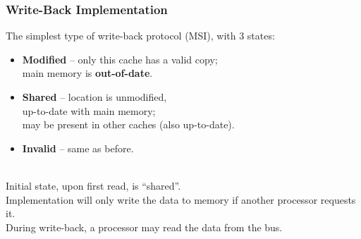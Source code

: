 \begin{frame}
  \frametitle{Write-Back Implementation}

  
     The simplest type of write-back protocol (MSI), with 3 states:
      \begin{itemize}
        \item {\bf Modified} -- only this cache has a valid copy; \\
          \quad main memory is {\bf out-of-date}.
        \item {\bf Shared} -- location is unmodified, \\
          \quad up-to-date with main
          memory; \\
          \quad may be present in other caches (also up-to-date).
        \item {\bf Invalid} -- same as before.
      \end{itemize}~\\
      
     Initial state, upon first read, is ``shared''.\\[1em]

     Implementation will only write the data to memory if another
        processor requests it.\\[1em]

     During write-back, a processor may read the data from the bus.
  
\end{frame}

